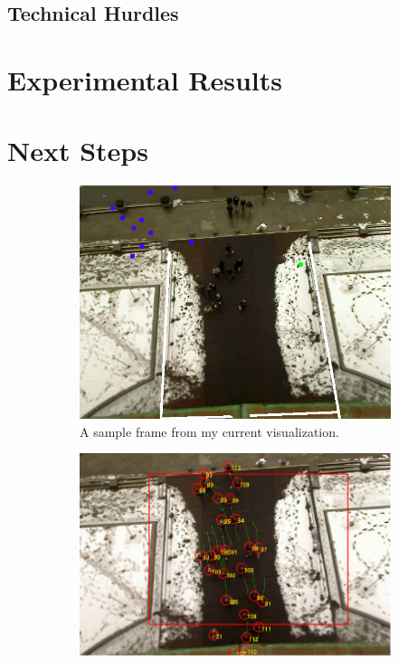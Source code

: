 \documentclass[a4paper,11pt,headings=small]{article}
\begin{document}
\subsection*{Technical Hurdles}

\section*{Experimental Results}

\section*{Next Steps}

\begin{figure}[h]
\centering
\begin{subfigure}[b]{0.8\textwidth}
\centering
\includegraphics[width=\textwidth]{dataset-bug.png}
\caption{A sample frame from my current visualization.}
\label{a}
\end{subfigure}
\begin{subfigure}[b]{0.8\textwidth}
\centering
\includegraphics[width=\textwidth]{dataset-example.png}

\end{subfigure}
\end{figure}
\end{document}
